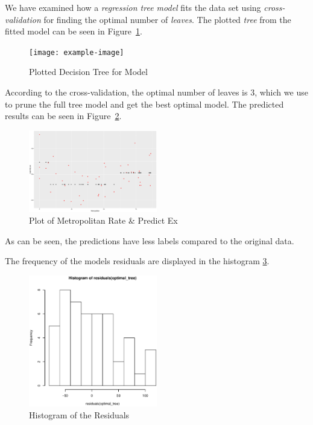 \documentclass[a4paper, twocolumn]{article}
\begin{document}
        We have examined how a \emph{regression tree model} fits the data set using \emph{cross-validation} for finding the optimal number of \emph{leaves}. The plotted \emph{tree} from the fitted model can be seen in Figure~\ref{fig:tree}.

        \begin{figure}[h!]
            \centering
            \caption{Plotted Decision Tree for Model}
            \label{fig:tree}
            \texttt{[image: example-image]}
        \end{figure}

        According to the cross-validation, the optimal number of leaves is 3, which we use to prune the full tree model and get the best optimal model. The predicted results can be seen in Figure~\ref{fig:predicted}.

        \begin{figure}[h!]
            \centering
            \caption{Plot of Metropolitan Rate \& Predict Ex}
            \label{fig:predicted}
            \includegraphics[width=0.5\textwidth]{share/A1_fit.eps}
        \end{figure}

        As can be seen, the predictions have less labels compared to the original data.

        The frequency of the models residuals are displayed in the histogram \ref{fig:residuals}.

        \begin{figure}[h!]
            \centering
            \caption{Histogram of the Residuals}
            \label{fig:residuals}
            \includegraphics[width=0.5\textwidth]{share/A1_historgram_residuals.eps}
        \end{figure}
\end{document}
